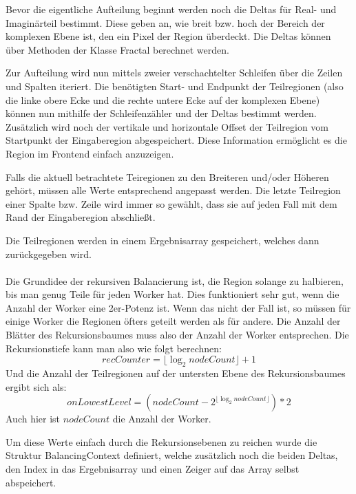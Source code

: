 Bevor die eigentliche Aufteilung beginnt werden noch die Deltas für Real- und Imaginärteil bestimmt.
Diese geben an, wie breit bzw. hoch der Bereich der komplexen Ebene ist, den ein Pixel der Region überdeckt.
Die Deltas können über Methoden der Klasse Fractal berechnet werden.

Zur Aufteilung wird nun mittels zweier verschachtelter Schleifen über die Zeilen und Spalten iteriert.
Die benötigten Start- und Endpunkt der Teilregionen (also die linke obere Ecke und die rechte untere Ecke auf der komplexen Ebene) können nun mithilfe der Schleifenzähler und der Deltas bestimmt werden.
Zusätzlich wird noch der vertikale und horizontale Offset der Teilregion vom Startpunkt der Eingaberegion abgespeichert. Diese Information ermöglicht es die Region im Frontend einfach anzuzeigen.

Falls die aktuell betrachtete Teiregionen zu den Breiteren und/oder Höheren gehört, müssen alle Werte entsprechend angepasst werden.
Die letzte Teilregion einer Spalte bzw. Zeile wird immer so gewählt, dass sie auf jeden Fall mit dem Rand der Eingaberegion abschließt.

Die Teilregionen werden in einem Ergebnisarray gespeichert, welches dann zurückgegeben wird.

\paragraph*{} \label{lastbalancierung_naiv_rekursion}
Die Grundidee der rekursiven Balancierung ist, die Region solange zu halbieren, bis man genug Teile für jeden Worker hat.
Dies funktioniert sehr gut, wenn die Anzahl der Worker eine 2er-Potenz ist. Wenn das nicht der Fall ist, so müssen für einige Worker die Regionen öfters geteilt werden als für andere.
Die Anzahl der Blätter des Rekursionsbaumes muss also der Anzahl der Worker entsprechen.
Die Rekursionstiefe kann man also wie folgt berechnen:
\begin{equation} \label{lastbalancierung_rekursion_tiefe}
	recCounter = \lfloor\log_2 nodeCount\rfloor + 1
\end{equation}
Und die Anzahl der Teilregionen auf der untersten Ebene des Rekursionsbaumes ergibt sich als:
\begin{equation} \label{lastbalancierung_rekursion_ebene}
	onLowestLevel = (nodeCount - 2^{\lfloor\log_2 nodeCount\rfloor}) * 2
\end{equation}
Auch hier ist $nodeCount$ die Anzahl der Worker.

Um diese Werte einfach durch die Rekursionsebenen zu reichen wurde die Struktur BalancingContext definiert, welche zusätzlich noch die beiden Deltas, den Index in das Ergebnisarray und einen Zeiger auf das Array selbst abspeichert.

